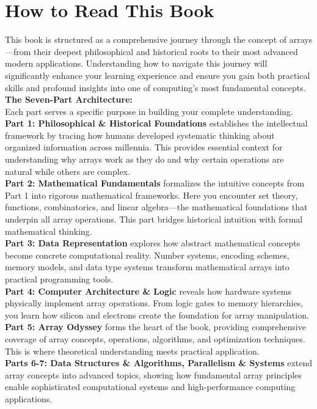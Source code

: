 \documentclass[12pt, oneside, openany]{book}
\begin{document}
	\tableofcontents
	\renewcommand{\arraystretch}{1.5} %
\mainmatter
\chapter*{How to Read This Book}

This book is structured as a comprehensive journey through the concept of arrays—from their deepest philosophical and historical roots to their most advanced modern applications. Understanding how to navigate this journey will significantly enhance your learning experience and ensure you gain both practical skills and profound insights into one of computing's most fundamental concepts.\\
\textbf{The Seven-Part Architecture:}\\
Each part serves a specific purpose in building your complete understanding. \textbf{Part 1: Philosophical \& Historical Foundations} establishes the intellectual framework by tracing how humans developed systematic thinking about organized information across millennia. This provides essential context for understanding why arrays work as they do and why certain operations are natural while others are complex.\\
\textbf{Part 2: Mathematical Fundamentals} formalizes the intuitive concepts from Part 1 into rigorous mathematical frameworks. Here you encounter set theory, functions, combinatorics, and linear algebra—the mathematical foundations that underpin all array operations. This part bridges historical intuition with formal mathematical thinking.\\
\textbf{Part 3: Data Representation} explores how abstract mathematical concepts become concrete computational reality. Number systems, encoding schemes, memory models, and data type systems transform mathematical arrays into practical programming tools.\\
\textbf{Part 4: Computer Architecture \& Logic} reveals how hardware systems physically implement array operations. From logic gates to memory hierarchies, you learn how silicon and electrons create the foundation for array manipulation.\\
\textbf{Part 5: Array Odyssey} forms the heart of the book, providing comprehensive coverage of array concepts, operations, algorithms, and optimization techniques. This is where theoretical understanding meets practical application.\\
\textbf{Parts 6-7: Data Structures \& Algorithms, Parallelism \& Systems} extend array concepts into advanced topics, showing how fundamental array principles enable sophisticated computational systems and high-performance computing applications.\\
\end{document}
